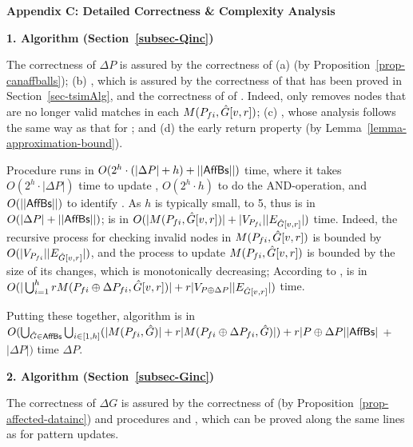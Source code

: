 

\vspace{1ex}
\noindent
{\large \textbf{Appendix C: Detailed Correctness \& Complexity Analysis}}
\label{sec-apd-complexity}

\noindent
{\textbf{1. Algorithm \incp (Section~\ref{subsec-Qinc})}}

The correctness of \incp \wrt $\Delta P$ is assured by
the correctness of (a) \identifyaffball (by Proposition~\ref{prop-canaffballs});
(b) \incmatch, which is assured by the correctness of \rgraphsim that has been proved in Section~\ref{sec-tsimAlg}, and the correctness of of \patedgeinsert. Indeed, \patedgeinsert only removes
nodes that are no longer valid matches in each $M(P_{fi}, \hat{G}{[v,r]})$;
(c) \comb, whose analysis follows the same way as that for \patedgeinsert; and
(d) the early return property (by Lemma~\ref{lemma-approximation-bound}).

\vspace{-1.5ex}
Procedure \identifyaffball runs in $O(2^{h}\cdot(|\Delta P|+h) +||{\mathsf{AffBs}}||)$ time, where it takes $O(2^{h}\cdot|\Delta P|)$ time to update \bfc, $O(2^{h}\cdot h)$ to do the AND-operation, and $O(||{\mathsf{AffBs}}||)$ to identify \affballsx.
As $h$ is typically small,  to 5, thus \identifyaffball is in $O(|\Delta P|+||{\mathsf{AffBs}}||)$;
\patedgeinsert is in $O(|M(P_{fi}, \hat{G}{[v,r]})|+|V_{P_{fi}}||E_{\hat{G}{[v,r]}}|)$ time.
Indeed, the recursive process for checking invalid nodes in $M(P_{fi}, \hat{G}{[v,r]})$ is bounded by $O(|V_{P_{fi}}||E_{\hat{G}{[v,r]}}|)$,
and the process to update $M(P_{fi}, \hat{G}{[v,r]})$ is bounded by the size of its changes, which is monotonically decreasing;
According to \patedgeinsert,
\comb is in $O(|\bigcup^{h}_{i=1} rM(P_{fi}\oplus\Delta P_{fi},\hat{G}{[v,r]})|+r|V_{P\oplus \Delta P}||E_{\hat{G}{[v,r]}}|)$ time.

\vspace{-1.5ex}
Putting these together, algorithm \incp is in
$O(\bigcup_{\hat{G}\in {\ensuremath {\mathsf{AffBs}}}}\bigcup_{i\in[1,h]}(|M(P_{fi}, \hat{G})|+r|M(P_{fi} \oplus \Delta P_{fi}, \hat{G})|) + r|P \oplus \Delta P||{\mathsf{AffBs}}|$ +$|\Delta P|)$ time \wrt $\Delta P$.


\noindent
{\textbf{2. Algorithm \incd (Section~\ref{subsec-Ginc})}}

The correctness of \incd \wrt $\Delta G$ is assured by the correctness of
\identifyaffball (by Proposition~\ref{prop-affected-datainc}) and procedures \incmatch and \comb,
which can be proved along the same lines as for pattern updates.

